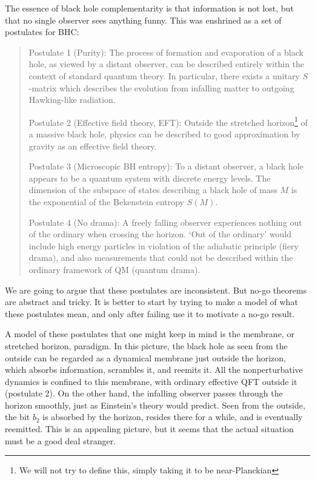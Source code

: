 \documentclass[12pt]{article}
\begin{document}
The essence of black hole complementarity is that information is not lost, but that no single observer sees anything funny.  This was enshrined as a set of postulates for BHC:


\begin{quote}

{Postulate 1 (Purity):} {The process of formation and evaporation of a black hole, as viewed by a distant observer, can be described entirely within the context of standard quantum theory. In particular, there exists a unitary $S$-matrix which describes the evolution from infalling matter to outgoing Hawking-like radiation.}

{Postulate 2 (Effective field theory, EFT):} {Outside the stretched horizon\footnote{We will not try to define this, simply taking it to be near-Planckian}
 of a massive black hole, physics can be described to good approximation by 
gravity as an effective field theory.}

{Postulate 3 (Microscopic BH entropy):} To a distant observer, a black hole appears to be a quantum system with discrete energy levels. The dimension of the subspace of states describing a black hole of mass $M$ is the exponential of the Bekenstein entropy $S(M)$.

{Postulate 4 (No drama):} A freely falling observer experiences nothing out of the ordinary when crossing the horizon.  `Out of the ordinary' would include high energy particles in violation of the adiabatic principle (fiery drama), and also measurements that could not be described within the ordinary framework of QM (quantum drama). 
\end{quote}
We are going to argue that these postulates are inconsistent.  But no-go theorems are abstract and tricky.  It is better to start by trying to make a model of what these postulates mean, and only after failing use it to motivate a no-go result.

A model of these postulates that one might keep in mind is the membrane, or stretched horizon, paradigm.  In this picture, the black hole  as seen from the outside can be regarded as a dynamical membrane just outside the horizon, which absorbs information, scrambles it, and reemits it.  All the nonperturbative dynamics is confined to this membrane, with ordinary effective QFT outside it (postulate 2).  On the other hand, the infalling observer passes through the horizon smoothly, just as Einstein's theory would predict.  Seen from the outside, the bit $b_2$ is absorbed by the horizon, resides there for a while, and is eventually reemitted.  
This is an appealing picture, but it seems that the actual situation must be a good deal stranger.
\end{document}
